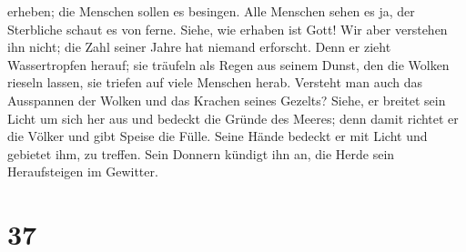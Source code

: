erheben; die Menschen sollen es besingen.  Alle Menschen
sehen es ja, der Sterbliche schaut es von ferne.  Siehe,
wie erhaben ist Gott! Wir aber verstehen ihn nicht; die Zahl seiner
Jahre hat niemand erforscht.  Denn er zieht Wassertropfen
herauf; sie träufeln als Regen aus seinem Dunst, den die Wolken rieseln
lassen,  sie triefen auf viele Menschen herab.
 Versteht man auch das Ausspannen der Wolken und das
Krachen seines Gezelts?  Siehe, er breitet sein Licht um
sich her aus und bedeckt die Gründe des Meeres;  denn
damit richtet er die Völker und gibt Speise die Fülle. 
Seine Hände bedeckt er mit Licht und gebietet ihm, zu treffen.
 Sein Donnern kündigt ihn an, die Herde sein
Heraufsteigen im Gewitter.

\hypertarget{section-36}{%
\section{37}\label{section-36}}

